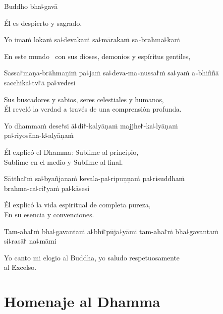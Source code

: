 Buddho bha꜕gavā

\begin{english}
  Él es despierto y sagrado.
\end{english}

Yo imaṁ lokaṁ sa꜕devakaṁ sa꜕mārakaṁ sa꜕brahma꜕kaṁ

\begin{english}
  En este mundo \pause\ con sus dioses, demonios y espíritus gentiles,
\end{english}

Sassa꜓maṇa-brāhmaṇiṁ pa꜕jaṁ sa꜕deva-ma꜕nussa꜓ṁ sa꜕yaṁ a꜕bhiññā sacchika꜕tv꜓ā pa꜕vedesi

\begin{english}
  Sus buscadores y sabios, seres celestiales y humanos,\\ Él reveló la verdad a través de una comprensión profunda.
\end{english}

Yo dhammaṁ dese꜓si ā꜕di꜓-kalyāṇaṁ majjhe꜓-ka꜕lyāṇaṁ \\pa꜕riyosāna-k꜕alyāṇaṁ

\begin{english}
  Él explicó el Dhamma: Sublime al principio,\\ Sublime en el medio y Sublime al final.
\end{english}

Sāttha꜓ṁ sa꜕byañjanaṁ kevala-pa꜕ripuṇṇaṁ pa꜕risuddhaṁ \\brahma-ca꜕ri꜓yaṁ pa꜕kāsesi

\begin{english}
  Él explicó la vida espiritual de completa pureza,\\En su esencia y convenciones.
\end{english}

Tam-aha꜓ṁ bha꜕gavantaṁ a꜕bhi꜓pūja꜕yāmi tam-aha꜓ṁ bha꜕gavantaṁ \\si꜕rasā꜓ na꜕māmi

\begin{english}
  Yo canto mi elogio al Buddha, yo saludo respetuosamente \\al Excelso.
\end{english}

\clearpage

\chapter{Homenaje al Dhamma}

\begin{leader}
\end{leader}

